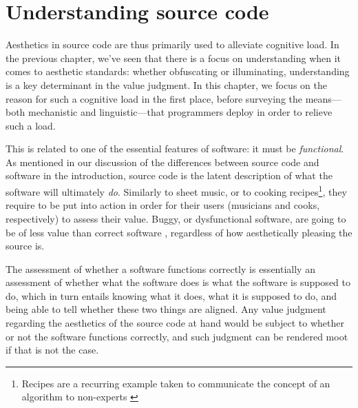 \chapter{Understanding source code}

Aesthetics in source code are thus primarily used to alleviate cognitive load. In the previous chapter, we've seen that there is a focus on understanding when it comes to aesthetic standards: whether obfuscating or illuminating, understanding is a key determinant in the value judgment. In this chapter, we focus on the reason for such a cognitive load in the first place, before surveying the means—both mechanistic and linguistic—that programmers deploy in order to relieve such a load.

This is related to one of the essential features of software: it must be \emph{functional}. As mentioned in our discussion of the differences between source code and software in the introduction, source code is the latent description of what the software will ultimately \emph{do}. Similarly to sheet music, or to cooking recipes\footnote{Recipes are a recurring example taken to communicate the concept of an algorithm to non-experts \citep{zeller_algorithms_2020}}, they require to be put into action in order for their users (musicians and cooks, respectively) to assess their value. Buggy, or dysfunctional software, are going to be of less value than correct software \citep{hill_what_2016}, regardless of how aesthetically pleasing the source is.

The assessment of whether a software functions correctly is essentially an assessment of whether what the software does is what the software is supposed to do, which in turn entails knowing what it does, what it is supposed to do, and being able to tell whether these two things are aligned. Any value judgment regarding the aesthetics of the source code at hand would be subject to whether or not the software functions correctly, and such judgment can be rendered moot if that is not the case.

